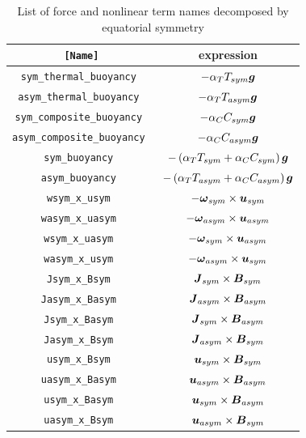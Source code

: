 %
%
\begin{table}[htp]
\caption{List of force and nonlinear term names decomposed by equatorial symmetry}
\begin{center}
\begin{tabular}{|c|c|}
\hline
{\tt [Name]} & expression  \\ \hline
\tt sym\_thermal\_buoyancy &  $ -\alpha_{T} T_{sym} \mbox{\boldmath$g$}  $ \\
\tt asym\_thermal\_buoyancy &  $ -\alpha_{T} T_{asym} \mbox{\boldmath$g$}  $ \\ \hline
\tt sym\_composite\_buoyancy &  $ -\alpha_{C} C_{sym} \mbox{\boldmath$g$}  $ \\
\tt asym\_composite\_buoyancy &  $ -\alpha_{C} C_{asym} \mbox{\boldmath$g$}  $ \\ \hline
\tt sym\_buoyancy &  $  -\left(\alpha_{T} T_{sym} +  \alpha_{C} C_{sym}  \right)\mbox{\boldmath$g$}  $ \\
\tt asym\_buoyancy &  $ -\left(\alpha_{T} T_{asym} + \alpha_{C} C_{asym} \right)\mbox{\boldmath$g$}  $ \\ \hline
%
\tt wsym\_x\_usym  &  $   - \mbox{\boldmath$\omega$}_{sym} \times \mbox{\boldmath$u$}_{sym} $ \\
\tt wasym\_x\_uasym  &  $ - \mbox{\boldmath$\omega$}_{asym} \times \mbox{\boldmath$u$}_{asym} $ \\
\tt wsym\_x\_uasym  &  $ - \mbox{\boldmath$\omega$}_{sym} \times \mbox{\boldmath$u$}_{asym} $ \\
\tt wasym\_x\_usym  &  $ - \mbox{\boldmath$\omega$}_{asym} \times \mbox{\boldmath$u$}_{sym} $ \\ \hline
%
\tt Jsym\_x\_Bsym  &  $ \mbox{\boldmath$J$}_{sym} \times \mbox{\boldmath$B$}_{sym} $ \\
\tt Jasym\_x\_Basym  &  $ \mbox{\boldmath$J$}_{asym} \times \mbox{\boldmath$B$}_{asym} $ \\
\tt Jsym\_x\_Basym  &  $ \mbox{\boldmath$J$}_{sym} \times \mbox{\boldmath$B$}_{asym} $ \\
\tt Jasym\_x\_Bsym  &  $ \mbox{\boldmath$J$}_{asym} \times \mbox{\boldmath$B$}_{sym} $ \\ \hline
%
\tt usym\_x\_Bsym  &  $ \mbox{\boldmath$u$}_{sym} \times \mbox{\boldmath$B$}_{sym} $ \\
\tt uasym\_x\_Basym  &  $ \mbox{\boldmath$u$}_{asym} \times \mbox{\boldmath$B$}_{asym} $ \\
\tt usym\_x\_Basym  &  $ \mbox{\boldmath$u$}_{sym} \times \mbox{\boldmath$B$}_{asym} $ \\
\tt uasym\_x\_Bsym  &  $ \mbox{\boldmath$u$}_{asym} \times \mbox{\boldmath$B$}_{sym} $ \\ \hline
\end{tabular}
\end{center}
\label{table:fields_sym2}
\end{table}
